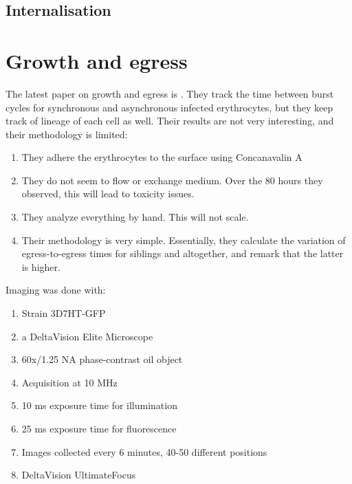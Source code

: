 \documentclass{article}
\begin{document}
\subsection{Internalisation}

\section{Growth and egress}

The latest paper on growth and egress is \cite{Park2018}. They track the time between burst cycles for synchronous and asynchronous infected erythrocytes, but they keep track of lineage of each cell as well. Their results are not very interesting, and their methodology is limited:

\begin{enumerate}
	\item They adhere the erythrocytes to the surface using Concanavalin A
	\item They do not seem to flow or exchange medium. Over the 80 hours they observed, this will lead to toxicity issues.
	\item They analyze everything by hand. This will not scale.
	\item Their methodology is very simple. Essentially, they calculate the variation of egress-to-egress times for siblings and altogether, and remark that the latter is higher.
\end{enumerate}

Imaging was done with:

\begin{enumerate}
	\item Strain 3D7HT-GFP
	\item a DeltaVision Elite Microscope
	\item 60x/1.25 NA phase-contrast oil object
	\item Acquisition at 10 MHz
	\item 10 ms exposure time for illumination
	\item 25 ms exposure time for fluorescence
	\item Images collected every 6 minutes, 40-50 different positions
	\item DeltaVision UltimateFocus
\end{enumerate}

{}

\end{document}
